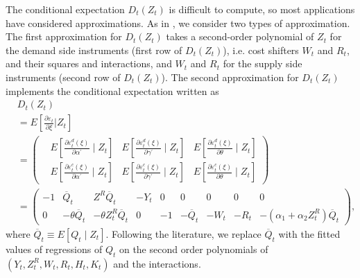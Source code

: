 \documentclass[11pt, a4paper]{article}
\begin{document}
The conditional expectation $D_{t}(Z_{t})$ is difficult to compute, so most applications have considered approximations. As in \cite{reynaert2014improving}, we consider two types of approximation. 
The first approximation for $D_{t}(Z_{t})$ takes a second-order polynomial of $Z_{t}$ for the demand side instruments (first row of $D_{t}(Z_{t})$), i.e. cost shifters $W_{t}$ and $R_{t}$, and their squares and interactions, and $W_{t}$ and $R_{t}$ for the supply side instruments (second row of $D_{t}(Z_{t})$).
The second approximation for $D_{t}(Z_{t})$ implements the conditional expectation written as 
\begin{align*}
    &D_{t}(Z_{t})\\
    &=E\left[\frac{\partial \varepsilon_{t}}{\partial \xi}| Z_{t}\right]\\
    &=
    \begin{pmatrix}
    & E\left[\frac{\partial \varepsilon_{t}^{d}(\xi)}{\partial \alpha^{\prime}} \mid Z_{t}\right] & 
    E\left[\frac{\partial \varepsilon_{t}^{d}(\xi)}{\partial \gamma^{\prime}} \mid Z_{t}\right] & 
    E\left[\frac{\partial \varepsilon_{t}^{d}(\xi)}{\partial \theta} \mid Z_{t}\right]\\
    & E\left[\frac{\partial \varepsilon_{t}^{c}(\xi)}{\partial \alpha^{\prime}} \mid Z_{t}\right] & 
    E\left[\frac{\partial \varepsilon_{t}^{c}(\xi)}{\partial \gamma^{\prime}} \mid Z_{t}\right] & 
    E\left[\frac{\partial \varepsilon_{t}^{c}(\xi)}{\partial \theta} \mid Z_{t}\right]
    \end{pmatrix} \\
    &=\begin{pmatrix}
    -1 & 
    \overline{Q}_{t} & 
    Z^{R} \overline{Q}_{t} & 
    - Y_{t} &
    0 & 0 & 0 & 0 & 0 \\
    0 &- \theta \overline{Q}_{t} & -\theta Z^{R}_{t}\overline{Q}_{t} & 0 & 
    -1 &
    - \overline{Q}_{t} &
    -W_{t} &
    -R_{t} &
    -(\alpha_1 + \alpha_2 Z^{R}_{t})\overline{Q}_{t}
    \end{pmatrix},
\end{align*}
where $ \overline{Q}_{t} \equiv E[Q_{t}\mid Z_{t}]$. Following the literature, we replace $ \overline{Q}_{t}$ with the fitted values of regressions of $Q_{t}$ on the second order polynomials of $(Y_{t}, Z_{t}^{R}, W_{t}, R_{t}, H_{t}, K_{t})$ and the interactions.
\end{document}
